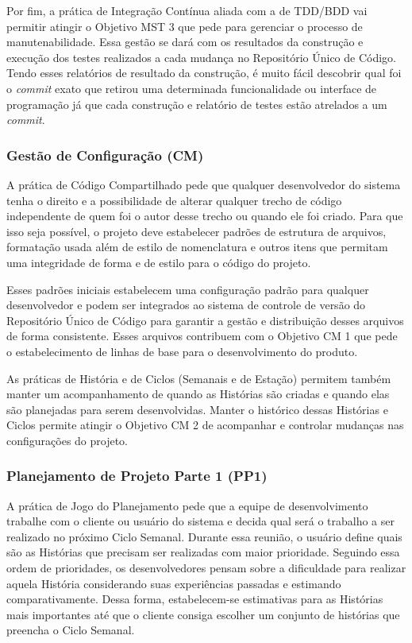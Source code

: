 Por fim, a prática de Integração Contínua aliada com a de TDD/BDD vai
permitir atingir o Objetivo MST 3 que pede para gerenciar o processo
de manutenabilidade. Essa gestão se dará com os resultados da
construção e execução dos testes realizados a cada mudança no
Repositório Único de Código. Tendo esses relatórios de resultado da
construção, é muito fácil descobrir qual foi o \textit{commit} exato
que retirou uma determinada funcionalidade ou interface de programação
já que cada construção e relatório de testes estão atrelados a um
\textit{commit}.

\subsubsection{Gestão de Configuração (CM)}
\label{sec:+cm}

A prática de Código Compartilhado pede que qualquer desenvolvedor do
sistema tenha o direito e a possibilidade de alterar qualquer trecho
de código independente de quem foi o autor desse trecho ou quando ele
foi criado. Para que isso seja possível, o projeto deve estabelecer
padrões de estrutura de arquivos, formatação usada além de estilo de
nomenclatura e outros itens que permitam uma integridade de forma e de
estilo para o código do projeto.

Esses padrões iniciais estabelecem uma configuração padrão para
qualquer desenvolvedor e podem ser integrados ao sistema de controle
de versão do Repositório Único de Código para garantir a gestão e
distribuição desses arquivos de forma consistente. Esses arquivos
contribuem com o Objetivo CM 1 que pede o estabelecimento de linhas de
base para o desenvolvimento do produto.

As práticas de História e de Ciclos (Semanais e de Estação) permitem
também manter um acompanhamento de quando as Histórias são criadas e
quando elas são planejadas para serem desenvolvidas. Manter o
histórico dessas Histórias e Ciclos permite atingir o Objetivo CM 2 de
acompanhar e controlar mudanças nas configurações do projeto.

\subsubsection{Planejamento de Projeto Parte 1 (PP1)}
\label{sec:+pp1}

A prática de Jogo do Planejamento pede que a equipe de desenvolvimento
trabalhe com o cliente ou usuário do sistema e decida qual será o
trabalho a ser realizado no próximo Ciclo Semanal. Durante essa
reunião, o usuário define quais são as Histórias que precisam ser
realizadas com maior prioridade. Seguindo essa ordem de prioridades,
os desenvolvedores pensam sobre a dificuldade para realizar aquela
História considerando suas experiências passadas e estimando
comparativamente. Dessa forma, estabelecem-se estimativas para as
Histórias mais importantes até que o cliente consiga escolher um
conjunto de histórias que preencha o Ciclo Semanal.

